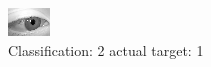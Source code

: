 \begin{figure}[h!]
\begin{center}
\includegraphics[width=0.60\columnwidth]{figures/ID2745_class_2_target_1.png}
\end{center}
\caption{ Classification: 2 actual target: 1}
\label{fig:ID2745_class_2_target_1}
\end{figure}
